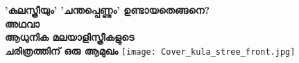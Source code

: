 \begin{titlepage}
\begin{center}
\textbf{'കുലസ്ത്രീയും' 'ചന്തപ്പെണ്ണും' ഉണ്ടായതെങ്ങനെ?\\ അഥവാ \\ ആധുനിക മലയാളിസ്ത്രീകളുടെ\\
ചരിത്രത്തിന് ഒരു ആമുഖം}
\texttt{[image: Cover\_kula\_stree\_front.jpg]}
\end{center}


\end{titlepage}